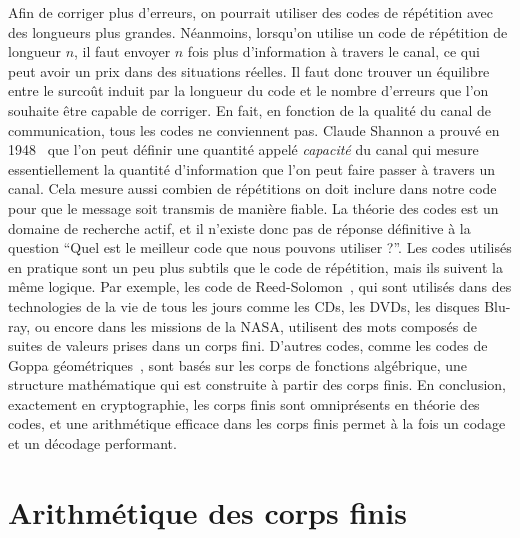Afin de corriger plus d'erreurs, on pourrait utiliser des codes de répétition
avec des longueurs plus grandes. Néanmoins, lorsqu'on utilise un code de
répétition de longueur $n$, il faut envoyer $n$ fois plus d'information à
travers le canal, ce qui peut avoir un prix dans des situations réelles. Il faut
donc trouver un équilibre entre le surcoût induit par la longueur du code et le
nombre d'erreurs que l'on souhaite être capable de corriger. En fait, en
fonction de la qualité du canal de communication, tous les codes ne conviennent
pas. Claude Shannon a prouvé en 1948~\cite{Shannon48} que l'on peut définir une
quantité appelé \emph{capacité} du canal qui mesure essentiellement la quantité
d'information que l'on peut faire passer à travers un canal. Cela mesure aussi
combien de répétitions on doit inclure dans notre code pour que le message soit
transmis de manière fiable. La théorie des codes est un domaine de recherche
actif, et il n'existe donc pas de réponse définitive à la question ``Quel est le
meilleur code que nous pouvons utiliser ?''. Les codes utilisés en pratique sont
un peu plus subtils que le code de répétition, mais ils suivent la même logique.
Par exemple, les code de Reed-Solomon~\cite{RS60}, qui sont utilisés dans des
technologies de la vie de tous les jours comme les CDs, les DVDs, les disques
Blu-ray, ou encore dans les missions de la NASA, utilisent des mots composés de 
suites de valeurs prises dans un corps fini. D'autres codes, comme les codes de
Goppa géométriques~\cite{Goppa81}, sont basés sur les corps de fonctions
algébrique, une structure mathématique qui est construite à partir des corps
finis. En conclusion, exactement en cryptographie, les corps finis sont
omniprésents en théorie des codes, et une arithmétique efficace dans les corps
finis permet à la fois un codage et un décodage performant.

\section*{Arithmétique des corps finis}

